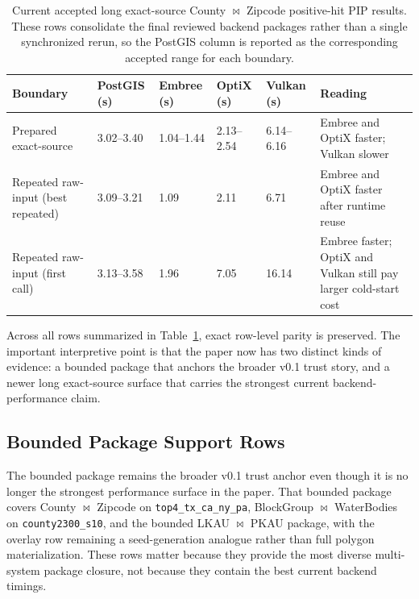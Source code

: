\documentclass[conference]{IEEEtran}
\begin{document}
\begin{table}[t]
\caption{Current accepted long exact-source County $\bowtie$ Zipcode positive-hit PIP results. These rows consolidate the final reviewed backend packages rather than a single synchronized rerun, so the PostGIS column is reported as the corresponding accepted range for each boundary.}
\label{tab:four-system-main}
\centering
\small
\setlength{\tabcolsep}{4pt}
\begin{tabular}{p{}p{}p{}p{}p{}p{}}
\toprule
Boundary & PostGIS (s) & Embree (s) & OptiX (s) & Vulkan (s) & Reading \\
\midrule
Prepared exact-source & 3.02--3.40 & 1.04--1.44 & 2.13--2.54 & 6.14--6.16 & Embree and OptiX faster; Vulkan slower \\
Repeated raw-input (best repeated) & 3.09--3.21 & 1.09 & 2.11 & 6.71 & Embree and OptiX faster after runtime reuse \\
Repeated raw-input (first call) & 3.13--3.58 & 1.96 & 7.05 & 16.14 & Embree faster; OptiX and Vulkan still pay larger cold-start cost \\
\bottomrule
\end{tabular}
\end{table}

Across all rows summarized in Table~\ref{tab:four-system-main}, exact row-level
parity is preserved. The important interpretive point is that the paper now has
two distinct kinds of evidence: a bounded package that anchors the broader
v0.1 trust story, and a newer long exact-source surface that carries the
strongest current backend-performance claim.

\subsection{Bounded Package Support Rows}

The bounded package remains the broader v0.1 trust anchor even though it is no
longer the strongest performance surface in the paper. That bounded package
covers County $\bowtie$ Zipcode on \texttt{top4\_tx\_ca\_ny\_pa}, BlockGroup
$\bowtie$ WaterBodies on \texttt{county2300\_s10}, and the bounded
LKAU $\bowtie$ PKAU package, with the overlay row remaining a seed-generation
analogue rather than full polygon materialization. These rows matter because
they provide the most diverse multi-system package closure, not because they
contain the best current backend timings.
\end{document}
